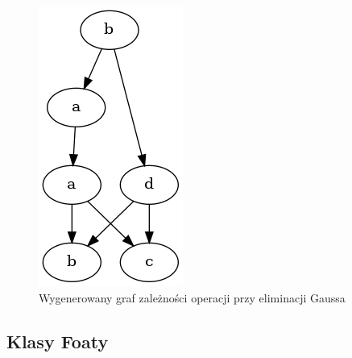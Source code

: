 \documentclass[12pt, letterpaper]{article}
\begin{document}
\begin{figure}[h]
	\centering
	\includegraphics[width=\textwidth]{graph.png}
	\caption{Wygenerowany graf zależności operacji przy eliminacji Gaussa}
\end{figure}

\subsection{Klasy Foaty}
\end{document}
